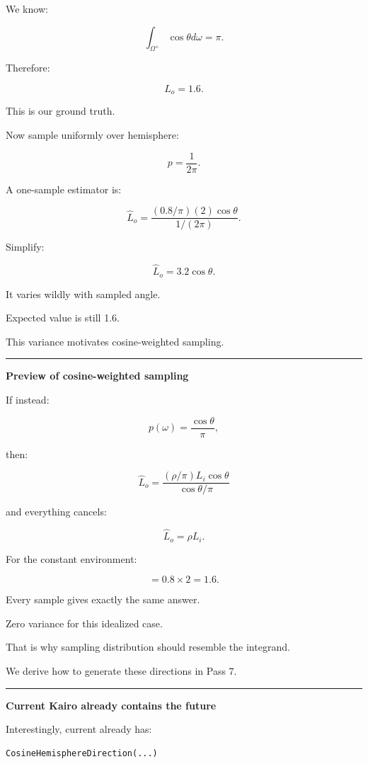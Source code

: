 We know:

\[
\int_{\Omega^+}
\cos\theta d\omega
=
\pi.
\]

Therefore:

\[
\boxed{
L_o=1.6.
}
\]

This is our ground truth.

Now sample uniformly over hemisphere:

\[
p=\frac1{2\pi}.
\]

A one-sample estimator is:

\[
\hat L_o
=
\frac{
(0.8/\pi)(2)\cos\theta
}{
1/(2\pi)
}.
\]

Simplify:

\[
\boxed{
\hat L_o
=
3.2\cos\theta.
}
\]

It varies wildly with sampled angle.

Expected value is still 1.6.

This variance motivates cosine-weighted sampling.

\begin{center}\rule{0.5\linewidth}{0.5pt}\end{center}

\textbf{Preview of cosine-weighted sampling}

If instead:

\[
p(\omega)
=
\frac{\cos\theta}{\pi},
\]

then:

\[
\hat L_o
=
\frac{
(\rho/\pi)L_i\cos\theta
}{
\cos\theta/\pi
}
\]

and everything cancels:

\[
\boxed{
\hat L_o
=
\rho L_i.
}
\]

For the constant environment:

\[
=
0.8\times2
=
1.6.
\]

Every sample gives exactly the same answer.

Zero variance for this idealized case.

That is why sampling distribution should resemble the integrand.

We derive how to generate these directions in Pass 7.

\begin{center}\rule{0.5\linewidth}{0.5pt}\end{center}

\textbf{Current Kairo already contains the future}

Interestingly, current  already has:

\begin{verbatim}
CosineHemisphereDirection(...)
\end{verbatim}

